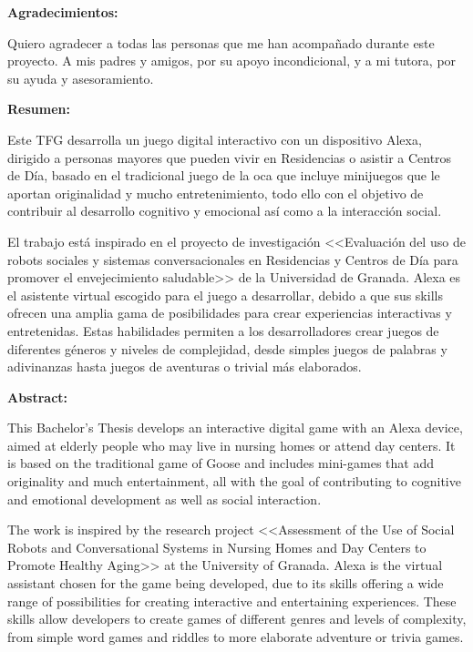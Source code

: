\documentclass[12pt]{article}
\begin{document}
\newpage
\justifying

\vline

\vspace{4cm}

\textbf{Agradecimientos:}

\vspace{1cm}

Quiero agradecer a todas las personas que me han acompañado durante este proyecto. A mis padres y amigos, por su apoyo incondicional, y a mi tutora, por su ayuda y asesoramiento.

\newpage

\textbf{Resumen:}

Este TFG desarrolla un juego digital interactivo con un dispositivo Alexa, dirigido a personas mayores que pueden vivir en Residencias o asistir a Centros de Día, basado en el tradicional juego de la oca que incluye minijuegos que le aportan originalidad y mucho entretenimiento, todo ello con el objetivo de contribuir al desarrollo cognitivo y emocional así como a la interacción social. 

El trabajo está inspirado en el proyecto de investigación <<Evaluación del uso de robots sociales y sistemas conversacionales en Residencias y Centros de Día para promover el envejecimiento saludable>> de la Universidad de Granada. Alexa es el asistente virtual escogido para el juego a desarrollar, debido a que sus skills ofrecen una amplia gama de posibilidades para crear experiencias interactivas y entretenidas. Estas habilidades permiten a los desarrolladores crear juegos de diferentes géneros y niveles de complejidad, desde simples juegos de palabras y adivinanzas hasta juegos de aventuras o trivial más elaborados.

\vline

\textbf{Abstract:}

This Bachelor's Thesis develops an interactive digital game with an Alexa device, aimed at elderly people who may live in nursing homes or attend day centers. It is based on the traditional game of Goose and includes mini-games that add originality and much entertainment, all with the goal of contributing to cognitive and emotional development as well as social interaction.

The work is inspired by the research project <<Assessment of the Use of Social Robots and Conversational Systems in Nursing Homes and Day Centers to Promote Healthy Aging>> at the University of Granada. Alexa is the virtual assistant chosen for the game being developed, due to its skills offering a wide range of possibilities for creating interactive and entertaining experiences. These skills allow developers to create games of different genres and levels of complexity, from simple word games and riddles to more elaborate adventure or trivia games.
\end{document}
